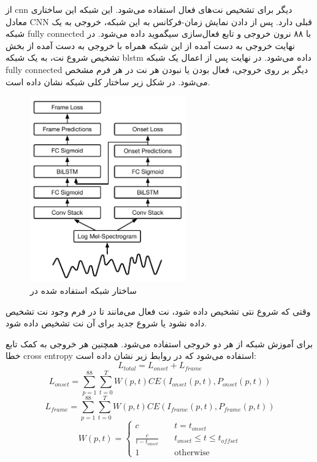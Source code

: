 از \gls{cnn} دیگر برای تشخیص نت‌های فعال استفاده می‌شود. این شبکه این ساختاری
معادل \gls{CNN} قبلی دارد. پس از دادن نمایش زمان-فرکانس به این شبکه، خروجی به یک
شبکه \gls{fully connected} با ۸۸ نرون خروجی و تابع فعال‌سازی سیگموید داده
می‌شود. در نهایت خروجی به دست آمده از این شبکه همراه با خروجی به دست آمده از بخش
تشخیص شروع نت، به یک شبکه \gls{blstm} داده می‌شود. در نهایت پس از اعمال یک شبکه
\gls{fully connected} دیگر بر روی خروجی، فعال بودن یا نبودن هر نت در هر فرم مشخص
می‌شود. در شکل زیر ساختار کلی شبکه نشان داده است.
\begin{figure}[ht]
    \centering
    \includegraphics[height=8cm]{./statics/onset_onframe_architecture.png}
    \caption{ساختار شبکه استفاده شده در \cite{hawthorne2017onsets}}
\end{figure}

وقتی که شروع نتی تشخیص داده شود، نت فعال می‌مانند تا در فرم وجود نت تشخیص داده
نشود یا شروع جدید برای آن نت تشخیص داده شود.

برای آموزش شبکه از هر دو خروجی استفاده می‌شود. همچنین هر خروجی به کمک تابع خطا
\gls{cross entropy} استفاده می‌شود که در روابط زیر نشان داده است:
\begin{equation}
    L_{total} = L_{onset} + L_{frame}
\end{equation}
\begin{equation}
    L_{onset} = \sum_{p=1}^{88} \sum_{t=0}^{T} W(p, t) CE(I_{onset}(p, t), P_{onset}(p, t))
\end{equation}
\begin{equation}
    L_{frame} = \sum_{p=1}^{88} \sum_{t=0}^{T} W(p, t) CE(I_{frame}(p, t), P_{frame}(p, t))
\end{equation}
\begin{equation}
    W(p, t) =
    \begin{cases}
        c &\quad t = t_{onset}\\
        \frac{c}{t - t_{onset}} &\quad t_{onset} \leq t \leq t_{offset}\\
        1 &\quad \text{otherwise}
    \end{cases}
\end{equation}

